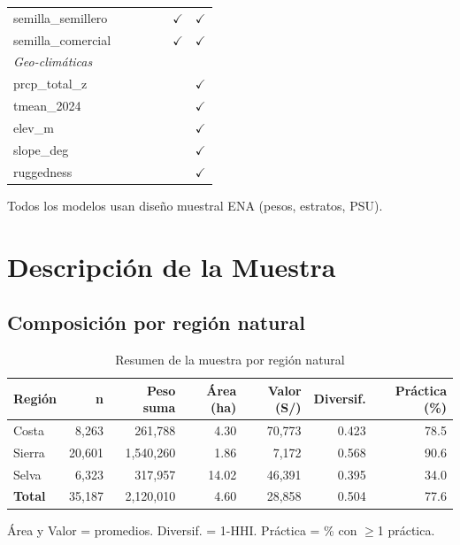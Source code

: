 \documentclass[11pt,a4paper]{article}
\begin{document}
\begin{table}[H]
\begin{threeparttable}
\begin{tabular}{p{4cm}cccccc}
semilla\_semillero & & & & & $\checkmark$ & $\checkmark$ \\
semilla\_comercial & & & & & $\checkmark$ & $\checkmark$ \\
\midrule
\multicolumn{7}{l}{\textit{Geo-climáticas}} \\
prcp\_total\_z & & & & & & $\checkmark$ \\
tmean\_2024 & & & & & & $\checkmark$ \\
elev\_m & & & & & & $\checkmark$ \\
slope\_deg & & & & & & $\checkmark$ \\
ruggedness & & & & & & $\checkmark$ \\
\bottomrule
\end{tabular}
\begin{tablenotes}
\footnotesize
\item Todos los modelos usan diseño muestral ENA (pesos, estratos, PSU).
\end{tablenotes}
\end{threeparttable}
\end{table}

\section{Descripción de la Muestra}

\subsection{Composición por región natural}

\begin{table}[H]
\centering
\caption{Resumen de la muestra por región natural}
\label{tab:sample_region}
\begin{threeparttable}
\small
\begin{tabular}{lrrrrrr}
\toprule
\textbf{Región} & \textbf{n} & \textbf{Peso suma} & \textbf{Área (ha)} & \textbf{Valor (S/)} & \textbf{Diversif.} & \textbf{Práctica (\%)} \\
\midrule
Costa & 8,263 & 261,788 & 4.30 & 70,773 & 0.423 & 78.5 \\
Sierra & 20,601 & 1,540,260 & 1.86 & 7,172 & 0.568 & 90.6 \\
Selva & 6,323 & 317,957 & 14.02 & 46,391 & 0.395 & 34.0 \\
\midrule
\textbf{Total} & 35,187 & 2,120,010 & 4.60 & 28,858 & 0.504 & 77.6 \\
\bottomrule
\end{tabular}
\begin{tablenotes}
\footnotesize
\item Área y Valor = promedios. Diversif. = 1-HHI. Práctica = \% con $\geq$1 práctica.
\end{tablenotes}
\end{threeparttable}
\end{table}
\end{document}
